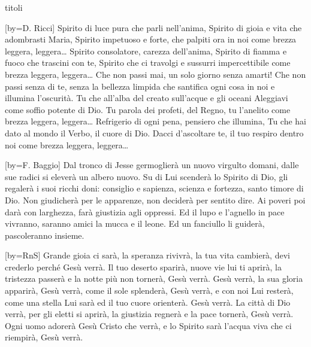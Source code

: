\begin{songs}{titoli}

[by={D. Ricci}]
\beginverse
Spirito di luce pura che parli nell'anima,
Spirito di gioia e vita che adombrasti Maria,
Spirito impetuoso e forte, che palpiti ora in noi
come brezza leggera, leggera…
\endverse
\beginverse
Spirito consolatore, carezza dell'anima,
Spirito di fiamma e fuoco che trascini con te,
Spirito che ci travolgi e sussurri impercettibile
come brezza leggera, leggera…
\endverse
\beginchorus
Che non passi mai, un solo giorno senza amarti!
Che non passi senza di te,
senza la bellezza limpida che santifica ogni cosa in noi
e illumina l'oscurità.
\endchorus
\beginverse
Tu che all'alba del creato sull'acque e gli oceani
Aleggiavi come soffio potente di Dio.
Tu parola dei profeti, del Regno, tu l'anelito
come brezza leggera, leggera…
\endverse
\beginverse
Refrigerio di ogni pena, pensiero che illumina,
Tu che hai dato al mondo il Verbo, il cuore di Dio.
Dacci d'ascoltare te, il tuo respiro dentro noi
come brezza leggera, leggera…
\endverse
\endsong

[by={F. Baggio}]
\beginchorus
Dal tronco di Jesse germoglierà un nuovo virgulto domani,
dalle sue radici si eleverà un albero nuovo.
\endchorus
\beginverse
Su di Lui scenderà lo Spirito di Dio, gli regalerà i suoi ricchi doni:
consiglio e sapienza, scienza e fortezza, santo timore di Dio.
\endverse
\beginverse
Non giudicherà per le apparenze, non deciderà per sentito dire.
Ai poveri poi darà con larghezza, farà giustizia agli oppressi.
\endverse
\beginverse
Ed il lupo e l'agnello in pace vivranno, saranno amici la mucca e il leone.
Ed un fanciullo li guiderà, pascoleranno insieme.
\endverse
\endsong

[by={RnS}]
\beginverse
Grande gioia ci sarà,
la speranza rivivrà,
la tua vita cambierà,
devi crederlo perché Gesù verrà.
Il tuo deserto sparirà,
nuove vie lui ti aprirà,
la tristezza passerà
e la notte più non tornerà,
Gesù verrà.
\endverse
\beginchorus
Gesù verrà,
la sua gloria apparirà,
Gesù verrà,
come il sole splenderà,
Gesù verrà,
e con noi Lui resterà,
come una stella Lui sarà ed il tuo cuore orienterà.
Gesù verrà. 
\endchorus
\beginverse
La città di Dio verrà,
per gli eletti si aprirà,
la giustizia regnerà
e la pace tornerà, Gesù verrà.
Ogni uomo adorerà
Gesù Cristo che verrà,
e lo Spirito sarà
l'acqua viva che ci riempirà,
Gesù verrà.
\endverse
\endsong


\end{songs}
